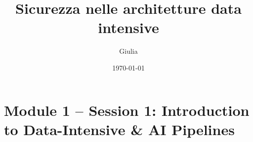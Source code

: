 \documentclass{article}
\title{Sicurezza nelle architetture data intensive}
\author{Giulia}
\date{\today}
\begin{document}
\maketitle

\section{Module 1 – Session 1: Introduction to Data-Intensive & AI Pipelines}
\end{document}
